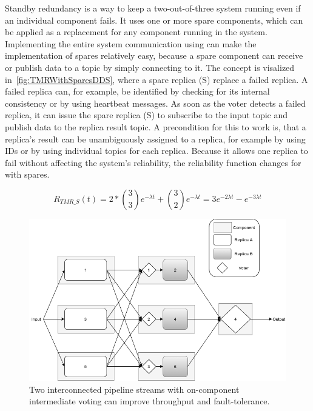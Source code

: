 Standby redundancy is a way to keep a two-out-of-three system running even if an individual component fails.
It uses one or more spare components, which can be applied as a replacement for any component running in the system.
Implementing the entire system communication using  can make the implementation of spares relatively easy, because a spare component can receive or publish data to a topic by simply connecting to it.
The concept is visalized in~\autoref{fig:TMRWithSparesDDS}, where a spare replica (S) replace a failed replica.
A failed replica can, for example, be identified by checking for its internal consistency or by using heartbeat messages.
As soon as the voter detects a failed replica, it can issue the spare replica (S) to subscribe to the input topic and publish data to the replica result topic.
A precondition for this to work is, that a replica's result can be unambiguously assigned to a replica, for example by using IDs or by using individual topics for each replica.
Because it allows one replica to fail without affecting the system's reliability, the reliability function changes for  with spares.

\begin{equation}
R_{TMR\_S}(t) = 2 * {3 \choose 3} e^{-\lambda t} + {3 \choose 2} e^{-\lambda t}
 = 3e^{-2 \lambda t} - e^{-3 \lambda t}
\end{equation}

\begin{figure}[!hb]
	\centering
	\includegraphics[width=0.75\linewidth]{images/InterconnectedVoterPipeline}
	\caption{Two interconnected pipeline streams with on-component intermediate voting can improve throughput and fault-tolerance.}
	\label{fig:PipelineIntermediateVoters}
\end{figure}


